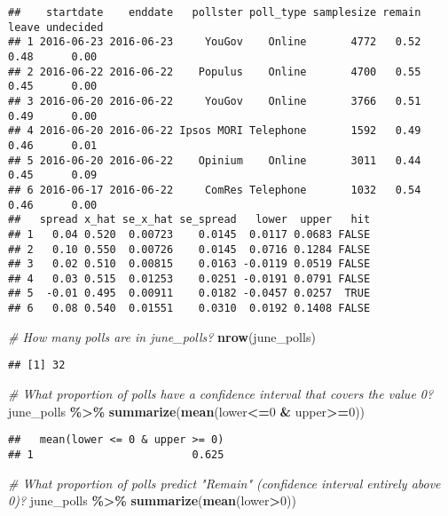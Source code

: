 \documentclass[
]{article}
\newenvironment{Shaded}{\begin{snugshade}}{\end{snugshade}}
\newcommand{\CommentTok}[1]{\textcolor[rgb]{0.56,0.35,0.01}{\textit{#1}}}
\newcommand{\DecValTok}[1]{\textcolor[rgb]{0.00,0.00,0.81}{#1}}
\newcommand{\KeywordTok}[1]{\textcolor[rgb]{0.13,0.29,0.53}{\textbf{#1}}}
\newcommand{\NormalTok}[1]{#1}
\newcommand{\OperatorTok}[1]{\textcolor[rgb]{0.81,0.36,0.00}{\textbf{#1}}}
\newcommand{\StringTok}[1]{\textcolor[rgb]{0.31,0.60,0.02}{#1}}
\begin{document}
\begin{verbatim}
##    startdate    enddate   pollster poll_type samplesize remain leave undecided
## 1 2016-06-23 2016-06-23     YouGov    Online       4772   0.52  0.48      0.00
## 2 2016-06-22 2016-06-22    Populus    Online       4700   0.55  0.45      0.00
## 3 2016-06-20 2016-06-22     YouGov    Online       3766   0.51  0.49      0.00
## 4 2016-06-20 2016-06-22 Ipsos MORI Telephone       1592   0.49  0.46      0.01
## 5 2016-06-20 2016-06-22    Opinium    Online       3011   0.44  0.45      0.09
## 6 2016-06-17 2016-06-22     ComRes Telephone       1032   0.54  0.46      0.00
##   spread x_hat se_x_hat se_spread   lower  upper   hit
## 1   0.04 0.520  0.00723    0.0145  0.0117 0.0683 FALSE
## 2   0.10 0.550  0.00726    0.0145  0.0716 0.1284 FALSE
## 3   0.02 0.510  0.00815    0.0163 -0.0119 0.0519 FALSE
## 4   0.03 0.515  0.01253    0.0251 -0.0191 0.0791 FALSE
## 5  -0.01 0.495  0.00911    0.0182 -0.0457 0.0257  TRUE
## 6   0.08 0.540  0.01551    0.0310  0.0192 0.1408 FALSE
\end{verbatim}

\begin{Shaded}
\begin{Highlighting}[]
\CommentTok{\# How many polls are in june\_polls?}
\KeywordTok{nrow}\NormalTok{(june\_polls)}
\end{Highlighting}
\end{Shaded}

\begin{verbatim}
## [1] 32
\end{verbatim}

\begin{Shaded}
\begin{Highlighting}[]
\CommentTok{\# What proportion of polls have a confidence interval that covers the value 0?}
\NormalTok{june\_polls }\OperatorTok{\%\textgreater{}\%}\StringTok{ }\KeywordTok{summarize}\NormalTok{(}\KeywordTok{mean}\NormalTok{(lower}\OperatorTok{\textless{}=}\DecValTok{0} \OperatorTok{\&}\StringTok{ }\NormalTok{upper}\OperatorTok{\textgreater{}=}\DecValTok{0}\NormalTok{))}
\end{Highlighting}
\end{Shaded}

\begin{verbatim}
##   mean(lower <= 0 & upper >= 0)
## 1                         0.625
\end{verbatim}

\begin{Shaded}
\begin{Highlighting}[]
\CommentTok{\# What proportion of polls predict "Remain" (confidence interval entirely above 0)?}
\NormalTok{june\_polls }\OperatorTok{\%\textgreater{}\%}\StringTok{ }\KeywordTok{summarize}\NormalTok{(}\KeywordTok{mean}\NormalTok{(lower}\OperatorTok{\textgreater{}}\DecValTok{0}\NormalTok{))}
\end{Highlighting}
\end{Shaded}
\end{document}
